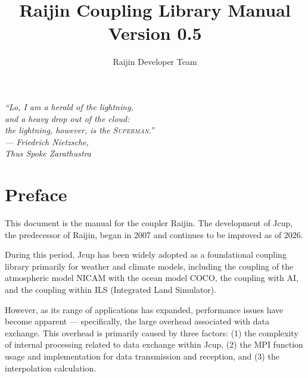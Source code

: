 \documentclass[11pt,a4paper]{report}
\title{Raijin Coupling Library Manual\\
Version 0.5}
\author{Raijin Developer Team}
\begin{document}
\maketitle

\vspace*{\fill}
\begin{flushright}
\begin{minipage}{0.75\textwidth}
\raggedleft
\large\itshape
``Lo, I am a herald of the lightning,\\
and a heavy drop out of the cloud:\\
the lightning, however, is the \textsc{Superman}.''\\[1em]
\normalsize\upshape
--- Friedrich Nietzsche,\\
\textit{Thus Spoke Zarathustra}
\end{minipage}
\end{flushright}
\vspace*{\fill}
 
\clearpage

\tableofcontents

\chapter*{Preface}

This document is the manual for the coupler Raijin.
The development of Jcup\cite{Arakawa2011,  Arakawa2020}, the predecessor of Raijin,
began in 2007 and continues to be improved as of 2026.

During this period, Jcup has been widely adopted as a foundational coupling library primarily for weather and climate models, including the coupling of the atmospheric model NICAM\cite{Satoh2014, Satoh2019} with the ocean model COCO\cite{Miyakawa2017}, the coupling with AI\cite{Arakawa2022}, and the coupling within ILS (Integrated Land Simulator)\cite{Nitta2020}.

However, as its range of applications has expanded,
performance issues have become apparent ---
specifically, the large overhead
associated with data exchange.
This overhead is primarily caused by three factors:
(1) the complexity of internal processing
related to data exchange within Jcup,
(2) the MPI function usage and implementation
for data transmission and reception,
and (3) the interpolation calculation.
\end{document}
